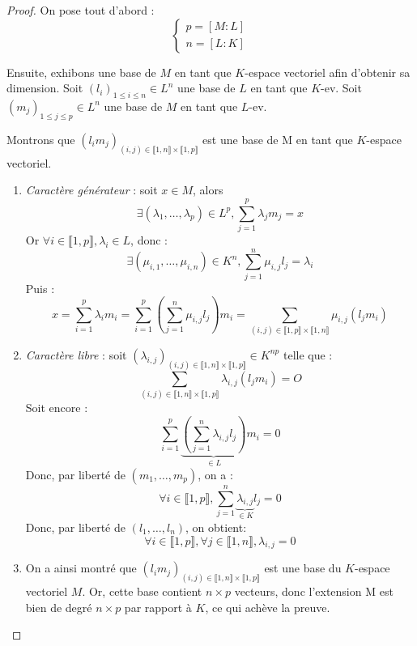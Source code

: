 \documentclass[a4paper,12pt,french]{report}
\begin{document}
				\begin{proof}
					On pose tout d'abord :
					\[
					\left\{
						\begin{array}{ll}
							p = [M:L] \\
							n = [L:K]
						\end{array}
					\right.
					\]
					
					
					Ensuite, exhibons une base de \(M\) en tant que \(K\)-espace vectoriel afin d'obtenir sa dimension.
					Soit \((l_i)_{1 \leq i \leq n} \in L^n\) une base de \(L\) en tant que \(K\)-ev.
					Soit \((m_j)_{1 \leq j \leq p} \in L^n\) une base de \(M\) en tant que \(L\)-ev.
					
					Montrons que \((l_i m_j)_{(i, j) \in \llbracket 1, n \rrbracket \times \llbracket 1, p \rrbracket}\) est une base de M en tant que \(K\)-espace vectoriel.
					\begin{enumerate}
					\item \emph{Caractère générateur} : soit \(x \in M\), alors 
						\[
						\exists (\lambda_1, \dots, \lambda_p) \in L^p, \sum_{j  = 1}^{p} \lambda_j m_j = x
						\]
						Or \(\forall i \in \llbracket 1, p \rrbracket, \lambda_i \in L\), donc :
						\[ 
						\exists (\mu_{i, 1}, \dots, \mu_{i, n}) \in K^n, \sum_{j  = 1}^{n} \mu_{i, j} l_j = \lambda_i 
						\]
						Puis :
						\[
						x 	= \sum_{i  = 1}^{p} \lambda_i m_i  
							= \sum_{i  = 1}^{p} \left(\sum_{j  = 1}^{n} \mu_{i, j} l_j\right) m_i 
							= \sum_{(i, j) \in \llbracket 1, p \rrbracket \times \llbracket 1, n \rrbracket}\mu_{i, j} (l_j m_i)
						\]
					\item \emph{Caractère libre} : soit \((\lambda_{i, j})_{ (i, j) \in \llbracket 1, n \rrbracket \times \llbracket 1, p \rrbracket} \in K^{np}\) telle que :
							\[
							\sum_{(i, j) \in \llbracket 1, n \rrbracket \times \llbracket 1, p \rrbracket} \lambda_{i, j} (l_j m_i) = O
							\]
						Soit encore :
							\[
							\sum_{i=1}^{p} \underbrace{\left( \sum_{j = 1}^{n} \lambda_{i, j} l_j \right)}_{\in L}m_i = 0
							\]
						Donc, par liberté de \((m_1, \dots, m_p)\), on a :
							\[
							\forall i \in \llbracket 1, p \rrbracket, \sum_{j = 1}^{n} \underbrace{\lambda_{i, j}}_{\in K} l_j = 0
							\]
						Donc, par liberté de \((l_1, \dots, l_n)\), on obtient:
							\[
							\forall i \in \llbracket 1, p \rrbracket, \forall j \in \llbracket 1, n \rrbracket, \lambda_{i, j} = 0
							\]
					\item On a ainsi montré que \((l_i m_j)_{(i, j) \in \llbracket 1, n \rrbracket \times \llbracket 1, p \rrbracket}\) est une base du \(K\)-espace vectoriel \(M\). Or, cette base contient \(n\times p\) vecteurs, donc l'extension M est bien de degré \(n\times p\) par rapport à \(K\), ce qui achève la preuve. \( \)
					
					\end{enumerate}
				\end{proof}
    
\end{document}
